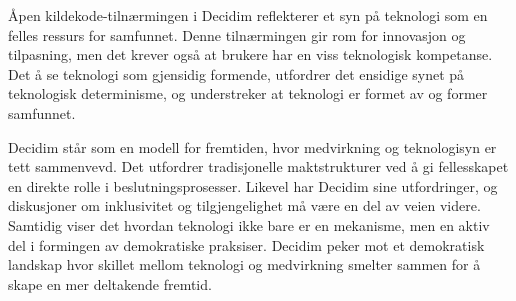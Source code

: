 \documentclass[a4paper, 12pt]{article}  %
\begin{document}
Åpen kildekode-tilnærmingen i Decidim reflekterer et syn på teknologi som en felles ressurs for samfunnet. Denne tilnærmingen gir rom for innovasjon og tilpasning, men det krever også at brukere har en viss teknologisk kompetanse. Det å se teknologi som gjensidig formende, utfordrer det ensidige synet på teknologisk determinisme, og understreker at teknologi er formet av og former samfunnet.

Decidim står som en modell for fremtiden, hvor medvirkning og teknologisyn er tett sammenvevd. Det utfordrer tradisjonelle maktstrukturer ved å gi fellesskapet en direkte rolle i beslutningsprosesser. Likevel har Decidim sine utfordringer, og diskusjoner om inklusivitet og tilgjengelighet må være en del av veien videre. Samtidig viser det hvordan teknologi ikke bare er en mekanisme, men en aktiv del i formingen av demokratiske praksiser. Decidim peker mot et demokratisk landskap hvor skillet mellom teknologi og medvirkning smelter sammen for å skape en mer deltakende fremtid.

\printbibliography[heading=bibintoc] %
\end{document}
